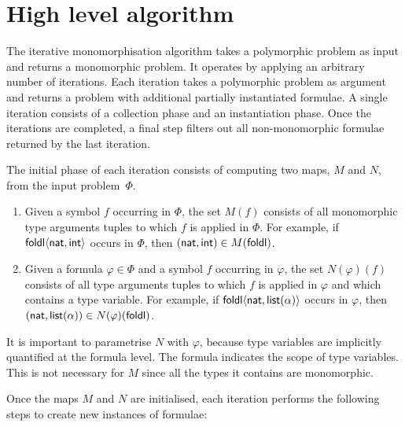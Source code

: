 \documentclass[runningheads]{llncs}
\begin{document}

\section{High level algorithm}
\label{sec:high level-algorithm}

The iterative monomorphisation algorithm takes a polymorphic problem as input and returns a monomorphic problem. It operates by applying an arbitrary number of iterations. Each iteration takes a polymorphic problem as argument and returns a problem with additional partially instantiated formulae. A single iteration consists of a collection phase and an instantiation phase. Once the iterations are completed, a final step filters out all non-monomorphic formulae returned by the last iteration.

The initial phase of each iteration consists of computing two maps, \(M\) and \(N\), from the input problem~$\Phi$.
%
\begin{enumerate}
\item[\labelitemi] Given a symbol \(f\) occurring in \(\Phi\), the set \(M(f)\) consists of all monomorphic type arguments tuples to which \(f\) is applied in \(\Phi\). For example, if \(\textsf{foldl}\langle \textsf{nat}, \textsf{int}\rangle\) occurs in \(\Phi\), then \((\textsf{nat}, \textsf{int}) \in M(\textsf{foldl}) \).

\smallskip

\item[\labelitemi] Given a formula \(\varphi \in \Phi\) and a symbol \(f\) occurring in \(\varphi\), the set \(N(\varphi)(f)\) consists of all type arguments tuples to which \(f\) is applied in \(\varphi\) and which contains a type variable. For example, if \(\textsf{foldl}\langle \textsf{nat}, \textsf{list}(\alpha)\rangle\) occurs in \(\varphi\), then \((\textsf{nat}, \textsf{list}(\alpha)) \in N(\varphi)(\textsf{foldl}) \).
\end{enumerate}

It is important to parametrise \(N\) with \(\varphi\), because type variables are implicitly quantified at the formula level. The formula indicates the scope of type variables. This is not necessary for \(M\) since all the types it contains are monomorphic.

Once the maps \(M\) and \(N\) are initialised, each iteration performs the following steps to create new instances of formulae:
\end{document}
